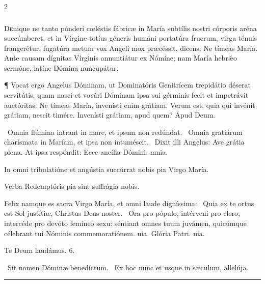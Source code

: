 \documentclass[9pt,twoside]{extarticle}
\begin{document}
\begin{multicols}{2}
\subsubsection*{\center {}}
\lettrine{D}enique ne tanto pónderi cœléstis fábricæ in María subtílis nostri córporis aréna succúmberet, et in Vírgine totíus géneris humáni portatúra frucrum, virga ténuis frangerétur, fugatúra metum vox Angeli mox præcéssit, dicens: Ne tímeas María. Ante causam dígnitas Vírginis annuntiátur ex Nómine; nam María hebrǽo sermóne, latíne Dómina nuncupátur.

¶ Vocat ergo Angelus Dóminam, ut Dominatóris Genitrícem trepidátio déserat servitútis, quam nasci et vocári Dóminam ipsa sui gérminis fecit et impetrávit auctóritas: Ne tímeas María, invenísti enim grátiam. Verum est, quia qui invénit grátiam, nescit timére. Invenísti grátiam, apud quem? Apud Deum.

\begin{tightlist}{}
\item {}~Omnia flúmina intrant in mare, et ipsum non redúndat. \textred{*}~Omnia gratiárum charísmata in Maríam, et ipsa non intuméscit. ~Dixit illi Angelus: Ave grátia plena. At ipsa respóndit: Ecce ancílla Dómini. mnia.
\item {\small {} In omni tribulatióne et angústia succúrrat nobis pia Virgo María.
\item {}
\item {} Verba Redemptóris pia sint suffrágia nobis.}
\item {}
\item {} Felix namque es sacra Virgo María, et omni laude digníssima: \textred{*}~Quia ex te ortus est Sol justítiæ, Christus Deus noster. ~Ora pro pópulo, intérveni pro clero, intercéde pro devóto femíneo sexu: séntiant omnes tuum juvámen, quicúmque célebrant tui Nóminis commemoratiónem. uia. Glória Patri. uia.
\item Te Deum laudámus. 6.
\item {}~Sit nomen Dóminæ benedíctum. ~Ex hoc nunc et usque in sæculum, allelúja.
\item {}
\end{tightlist}

\begin{center}\textcolor{red}{\rule{\linewidth}{0.5pt}} \end{center}


\end{multicols}
\end{document}
